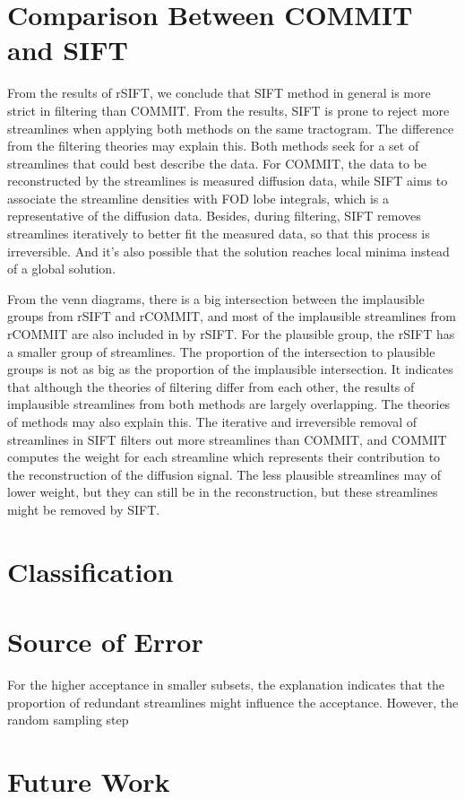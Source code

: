 \section{Comparison Between COMMIT and SIFT}

From the results of rSIFT, we conclude that SIFT method in general is more strict in filtering than COMMIT. From the results, SIFT 
is prone to reject more streamlines when applying both methods on the same tractogram.  
The difference from the filtering theories may explain this. 
Both methods seek for a set of streamlines that could best describe the data. For COMMIT, the data to be reconstructed by the streamlines is measured diffusion data, while 
SIFT aims to associate the streamline densities with FOD lobe integrals, which is a representative of the diffusion data. Besides,
during filtering, SIFT removes streamlines iteratively to better fit the measured data, so that this process is irreversible. And it's 
also possible that the solution reaches local minima instead of a global solution.


From the venn diagrams, there is a big intersection between the implausible groups from rSIFT and rCOMMIT, 
and most of the implausible streamlines from rCOMMIT are also included in by rSIFT. For the plausible 
group, the rSIFT has a smaller group of streamlines. The proportion of the intersection to plausible groups is not 
as big as the proportion of the implausible intersection. It indicates that although the theories of filtering differ from each other,
the results of implausible streamlines from both methods are largely overlapping. 
The theories of methods may also explain this. The iterative and irreversible removal of streamlines in SIFT filters out more streamlines than COMMIT,
and COMMIT computes the weight for each streamline which represents their contribution to the reconstruction of the diffusion signal. 
The less plausible streamlines may of lower weight, but they can still be in the reconstruction, but these streamlines might be removed by SIFT.


\section{Classification}

\section{Source of Error}
For the higher acceptance in smaller subsets, the explanation indicates that the proportion of redundant streamlines might influence
the acceptance. 
However, the random sampling step 


\section{Future Work}








